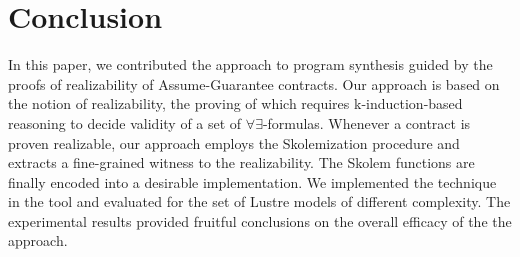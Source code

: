 \section{Conclusion}
\label{sec:conclusion}
In  this paper, we contributed the approach to program synthesis guided by the proofs of realizability of Assume-Guarantee contracts.
Our approach is based on the notion of realizability, the proving of which requires k-induction-based reasoning to decide validity of a set of $\forall\exists$-formulas.
Whenever a contract is proven realizable, our approach employs the Skolemization procedure and extracts a fine-grained witness to the realizability.
The Skolem functions are finally encoded into a desirable implementation.
We implemented the technique in the \toolname{} tool and evaluated for the set of Lustre models of different complexity.
The experimental results provided fruitful conclusions on the overall efficacy of the the approach.
